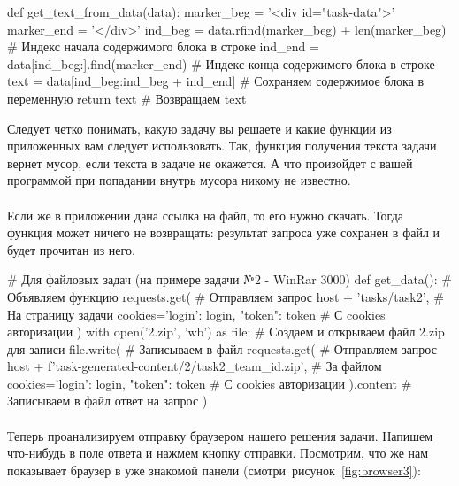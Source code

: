 \documentclass[12pt]{article}
\begin{document}
    \begin{pythoncode}
def get_text_from_data(data):
    marker_beg = '<div id="task-data">'
    marker_end = '</div>'
    ind_beg = data.rfind(marker_beg) + len(marker_beg)  # Индекс начала содержимого блока в строке
    ind_end = data[ind_beg:].find(marker_end)           # Индекс конца содержимого блока в строке
    text = data[ind_beg:ind_beg + ind_end]              # Сохраняем содержимое блока в переменную
    return text                                         # Возвращаем text
    \end{pythoncode}

    Следует четко понимать, какую задачу вы решаете и какие функции из приложенных вам следует использовать.
    Так, функция получения текста задачи вернет мусор, если текста в задаче не окажется.
    А что произойдет с вашей программой при попадании внутрь мусора никому не известно.
    \paragraph{}
    Если же в приложении дана ссылка на файл, то его нужно скачать.
    Тогда функция может ничего не возвращать: результат запроса уже сохранен в файл и будет прочитан из него.

    \begin{pythoncode}
# Для файловых задач (на примере задачи №2 - WinRar 3000)
def get_data():                                          # Объявляем функцию
    requests.get(                                        # Отправляем запрос
        host + 'tasks/task2',                            # На страницу задачи
        cookies={'login': login, "token": token}         # С cookies авторизации
    )
    with open('2.zip', 'wb') as file:                    # Создаем и открываем файл 2.zip для записи
        file.write(                                      # Записываем в файл
            requests.get(                                # Отправляем запрос
                host + f'task-generated-content/2/task2_{team_id}.zip', # За файлом
                cookies={'login': login, "token": token} # С cookies авторизации
            ).content                                    # Записываем в файл ответ на запрос
        )
    \end{pythoncode}

    \paragraph{}
    Теперь проанализируем отправку браузером нашего решения задачи.
    Напишем что-нибудь в поле ответа и нажмем кнопку отправки.
    Посмотрим, что же нам показывает браузер в уже знакомой панели (смотри~рисунок~\ref{fig:browser3}):
\end{document}
